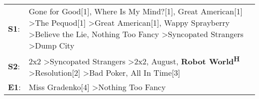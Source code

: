\begin{supertabular}{p{0.03\textwidth}p{0.92\textwidth}}
 \textbf{S1}:  &  Gone for Good[1]\textsuperscript{}, \enspace Where Is My Mind?[1]\textsuperscript{}, \enspace Great American[1]\textsuperscript{} \textgreater \enspace The Pequod[1]\textsuperscript{} \textgreater \enspace Great American[1]\textsuperscript{}, \enspace Wappy Sprayberry\textsuperscript{} \textgreater \enspace Believe the Lie\textsuperscript{}, \enspace Nothing Too Fancy\textsuperscript{} \textgreater \enspace Syncopated Strangers\textsuperscript{} \textgreater \enspace Dump City\textsuperscript{}  \enspace  \\
 \textbf{S2}:  &                                                                                                                                               2x2\textsuperscript{} \textgreater \enspace Syncopated Strangers\textsuperscript{} \textgreater \enspace 2x2\textsuperscript{}, \enspace August\textsuperscript{}, \enspace \textbf{Robot World\textsuperscript{H}} \textgreater \enspace Resolution[2]\textsuperscript{} \textgreater \enspace Bad Poker\textsuperscript{}, \enspace All In Time[3]\textsuperscript{}  \enspace  \\
 \textbf{E1}:  &                                                                                                                                                                                                                                                                                                                                                                                                                         Miss Gradenko[4]\textsuperscript{} \textgreater \enspace Nothing Too Fancy\textsuperscript{}  \enspace  \\
\end{supertabular}
